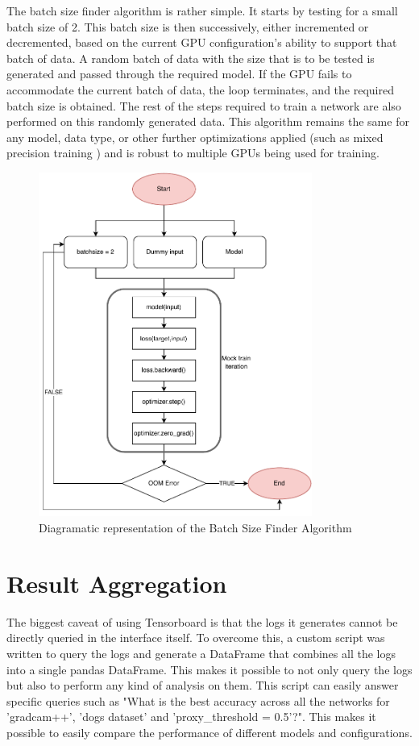 The batch size finder algorithm is rather simple. It starts by testing for a small batch size of 2. This batch size is then successively, either incremented or decremented, based on the current GPU configuration's ability to support that batch of data.
A random batch of data with the size that is to be tested is generated and passed through the required model. If the GPU fails to accommodate the current batch of data, the loop terminates, and the required batch size is obtained. The rest of the steps required to train a network are also performed on this randomly generated data.
This algorithm remains the same for any model, data type, or other further optimizations applied (such as mixed precision training \cite{micikeviciusMixedPrecisionTraining2017}) and is robust to multiple GPUs being used for training.

\begin{figure}[H]
    \centering
    \includegraphics[width=0.8\textwidth]{images/batchsizefinder.pdf}
    \caption{Diagramatic representation of the Batch Size Finder Algorithm}
    \label{fig:bsfinder}
\end{figure}

\section{Result Aggregation} \label{sec:result_aggregation}
The biggest caveat of using Tensorboard is that the logs it generates cannot be directly queried in the interface itself. To overcome this, a custom script was written to query the logs and generate a DataFrame that combines all the logs into a single pandas DataFrame. This makes it possible to not only query the logs but also to perform any kind of analysis on them. This script can easily answer specific queries such as "What is the best accuracy across all the networks for 'gradcam++', 'dogs dataset' and 'proxy\_threshold = 0.5'?". This makes it possible to easily compare the performance of different models and configurations.

